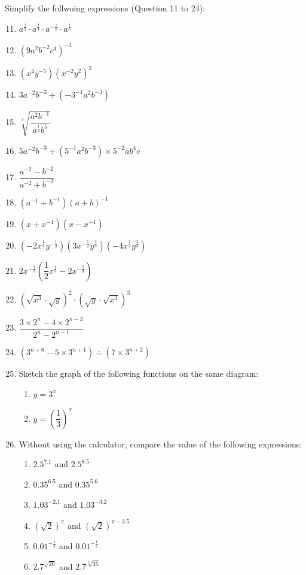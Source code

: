 \documentclass[12pt]{report}
\begin{document}
\begin{multicols}{2}
  \noindent Simplify the follwoing expressions (Question 11 to 24):
  \begin{enumerate}
    \setcounter{enumi}{10}
    \item $a^{\frac{1}{2}}\cdot a^{\frac{1}{4}}\cdot a^{-{\frac{1}{8}}}\cdot a^{\frac{1}{6}}$
    \item $\left(9a^{2}b^{-2}c^{4}\right)^{-1}$
    \item $\left(x^{4}y^{-5}\right)\left(x^{-2}y^{2}\right)^{2}$
    \item $3a^{-2}b^{-3}\div\left(-3^{-1}a^{2}b^{-3}\right)$
    \item $\sqrt[3]{\dfrac{a^{2}b^{-1}}{a^{\frac{1}{2}}b^{5}}}$
    \item $5a^{-2}b^{-3}\div\left(5^{-1}a^{2}b^{-3}\right)\times 5^{-2}a b^{4}c$
    \item $\dfrac{a^{-2}-b^{-2}}{a^{-2}+b^{-2}}$
    \item $\left(a^{-1}+b^{-1}\right)\left(a+b\right)^{-1}$
    \item $\left(x+x^{-1}\right)\left(x-x^{-1}\right)$
    \item $\left(-2x^{\frac{1}{4}}y^{-\frac{1}{3}}\right)\left(3x^{-\frac{1}{2}}y^{\frac{2}{3}}\right)\left(-4x^{\frac{1}{4}}y^{\frac{2}{3}}\right)$
    \item $2x^{-{\frac{1}{3}}}\left({\dfrac{1}{2}}x^{{\frac{1}{3}}}-2x^{-{\frac{2}{3}}}\right)$
    \item $\left(\sqrt{x^{3}}\cdot\sqrt{y}\right)^{2}\cdot\left(\sqrt{y}\cdot\sqrt{x^{3}}\right)^{3}$
    \item $\dfrac{3\times2^{n}-4\times2^{n-2}}{2^{n}-2^{n-1}}$
    \item $\left(3^{n+6}-5\times3^{n+1}\right)\div\left(7\times3^{n+2}\right)$
    \item Sketch the graph of the following functions on the same diagram:
          \begin{enumerate}[label=(\alph*)]
            \item $y = 3^x$
            \item $y = \left(\dfrac{1}{3}\right)^x$
          \end{enumerate}
    \item Without using the calculator, compare the value of the following expressions:
          \begin{enumerate}
            \item $2.5^{7.1}$ and $2.5^{8.5}$
            \item $0.35^{6.5}$ and $0.35^{5.6}$
            \item $1.03^{-2.1}$ and $1.03^{-3.2}$
            \item $\left(\sqrt{2}\right)^\pi$ and $\left(\sqrt{2}\right)^{\pi - 3.5}$
            \item $0.01^{-\frac{1}{3}}$ and $0.01^{-\frac{1}{2}}$
            \item $2.7^{\sqrt{20}}$ and $2.7^{\sqrt[3]{35}}$
          \end{enumerate}


\end{enumerate}
\end{multicols}
\end{document}

